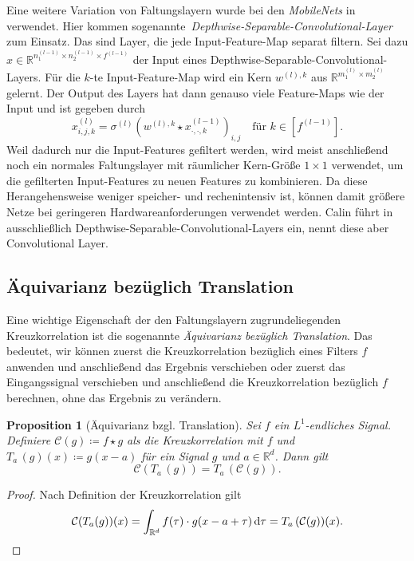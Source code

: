 \documentclass[paper=a4, 	%
		fontsize=11pt,
		abstract=true, 	%
		headsepline, 	%
		notitlepage	%
		]{scrartcl}
\newtheorem{proposition}[theorem]{Proposition}
\theoremstyle{definition}
\newcommand{\R}{\mathbb{R}}
\newcommand{\diff}{\,\textrm{d}}
\newcommand{\bcdot}{\boldsymbol{\cdot}}
\newcommand{\transl}[2]{T_{#1}\, #2}
\newcommand{\fNat}[1]{[ #1 ]}
\begin{document}
Eine weitere Variation von Faltungslayern wurde bei den \emph{MobileNets} in~\cite{DBLP:journals/corr/HowardZCKWWAA17} verwendet.
Hier kommen sogenannte~\emph{\foreignlanguage{english}{Depthwise-Separable-Convolutional-Layer}} zum Einsatz.
Das sind Layer, die jede Input-Feature-Map separat filtern.
Sei dazu $x\in\R^{n_1^{(l-1)}\times n_2^{(l-1)}\times f^{(l-1)}}$ der Input eines Depthwise-Separable-Convolutional-Layers.
Für die $k$-te Input-Feature-Map wird ein Kern $w^{(l),k}$ aus $\R^{m_1^{(l)}\times m_2^{(l)}}$ gelernt.
Der Output des Layers hat dann genauso viele Feature-Maps wie der Input und ist gegeben durch
\[
    x^{(l)}_{i,j,k} = \sigma^{(l)}\left( w^{(l),k} \star x^{(l-1)}_{\bcdot,\bcdot, k}\right)_{i,j} \quad \text{für $k\in\fNat{f^{(l-1)}}$}.
\]
Weil dadurch nur die Input-Features gefiltert werden, wird meist anschließend noch ein normales Faltungslayer mit räumlicher Kern-Größe $1\times 1$ verwendet, um die gefilterten Input-Features zu neuen Features zu kombinieren.
Da diese Herangehensweise weniger speicher- und rechenintensiv ist, können damit  größere Netze bei geringeren Hardwareanforderungen verwendet werden.
Calin führt in~\cite[Abschnitt~16.5]{Calin2020} ausschließlich Depthwise-Separable-Convolutional-Layers ein, nennt diese aber \glqq Convolutional Layer\grqq.

\subsection{Äquivarianz bezüglich Translation}
    
Eine wichtige Eigenschaft der den Faltungslayern zugrundeliegenden Kreuzkorrelation ist die sogenannte \emph{Äquivarianz bezüglich Translation}.
Das bedeutet, wir können zuerst die Kreuzkorrelation bezüglich eines Filters $f$ anwenden und anschließend das Ergebnis verschieben oder zuerst das Eingangssignal verschieben und anschließend die Kreuzkorrelation bezüglich $f$ berechnen, ohne das Ergebnis zu verändern.\\

\begin{samepage}
\begin{proposition}[Äquivarianz bzgl. Translation]
    Sei $f$ ein $L^1$-endliches Signal.
    Definiere $\mathcal{C}(g)\coloneqq f\star g$ als die Kreuzkorrelation mit $f$ und $\transl{a}{(g)}(x) \coloneqq g(x - a)$ für ein Signal $g$ und $a\in\R^d$.
    Dann gilt \[ \mathcal{C}(\transl{a}{(g)}) = \transl{a}{(\mathcal{C}(g))}. \]
\end{proposition}
\end{samepage}
\begin{proof}
    Nach Definition der Kreuzkorrelation gilt
    \[\mathcal{C}(T_a(g))(x) = \int_{\R^d} f(\tau) \cdot g(x - a + \tau) \diff \tau = \transl{a}{(\mathcal{C}(g))}(x).\qedhere\]
\end{proof}
\end{document}
